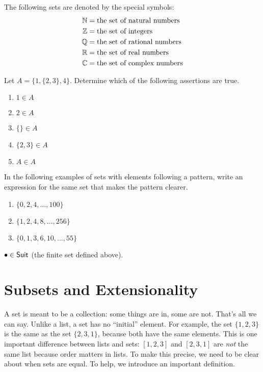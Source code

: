 \begin{defn}
	The following sets are denoted by the special symbols:
	\begin{align*}
		\mathbb N &= \text{the set of natural numbers}\\
		\mathbb Z &= \text{the set of integers}\\
		\mathbb Q &= \text{the set of rational numbers}\\
		\mathbb R &= \text{the set of real numbers}\\
		\mathbb C &= \text{the set of complex numbers}
	\end{align*}
\end{defn}

\begin{exercises}
	\begin{firstexercise}
  \item Let $A = \{1,\{2,3\},4\}$. Determine which of the following assertions are true.
    \begin{enumerate}
    \item $1\in A$
    \item $2\in A$
    \item $\{\}\in A$
    \item $\{2,3\}\in A$
    \item $A\in A$
    \end{enumerate}
  \item In the following examples of sets with elements following a pattern, write an expression for the same set
  that makes the pattern clearer.
  \begin{enumerate}
  \item $\{0,2,4,\ldots, 100\}$
  \item $\{1,2,4,8,\ldots, 256\}$
  \item $\{0,1,3, 6, 10,\ldots, 55\}$
  \end{enumerate}
  \item $\bullet\in {\mathord{\textsf{Suit}}}$ (the finite set defined above).
  \end{firstexercise}
\end{exercises}

\section{Subsets and Extensionality}

A set is meant to be a collection: some things are in, some are not. 
That's all we can say.
Unlike a list, a set has no ``initial'' element.
For example, the set $\{1,2,3\}$ is the same as the set $\{2,3,1\}$, because both have the same elements. This is one important difference between
lists and sets: $[1,2,3]$ and $[2,3,1]$ are \emph{not} the same list because order matters in lists. 
To make this precise, we need to be clear about when sets are equal. To help, we introduce an important definition.

